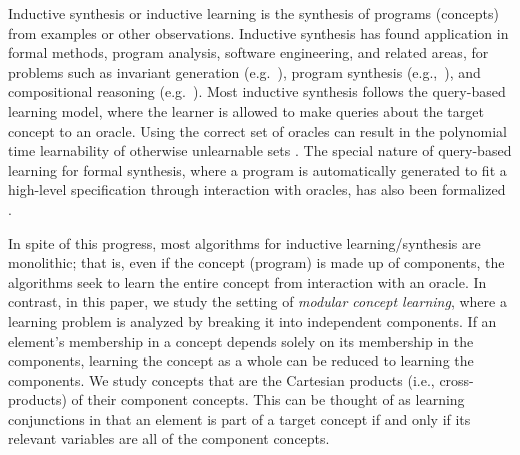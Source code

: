
Inductive synthesis or inductive learning 
is the synthesis of programs (concepts) from examples or other observations. 
Inductive synthesis has found application in formal methods, program analysis,
software engineering, and related areas, for problems such as 
invariant generation (e.g.~\cite{garg2014ice}),
program synthesis (e.g.,~\cite{solar2006combinatorial}),
and compositional reasoning (e.g.~\cite{cobleigh2003learning}).
Most inductive synthesis follows the query-based learning model, where the
learner is allowed to make queries about the target concept to an oracle. 
Using the correct set of oracles can result in the polynomial time learnability of otherwise unlearnable sets \cite{angluin1988queries}. 
The special nature of query-based learning for formal synthesis, where a program is automatically generated to fit a high-level specification through interaction with oracles,
has also been formalized \cite{jha2017theory}. 

In spite of this progress,
most algorithms for inductive learning/synthesis are monolithic; that is, even
if the concept (program) is made up of components, the algorithms seek to
learn the entire concept from interaction with an oracle.
In contrast, in this paper, we study the setting of {\em modular concept learning},
where a learning problem is analyzed by breaking it into independent components. 
If an element's membership in a concept depends solely on its membership in the components, learning the concept as a whole can be reduced to learning the components. 
We study concepts that are the Cartesian products (i.e., cross-products) of their component concepts.  
This can be thought of as learning conjunctions in that an element is part of a target concept if and only if its relevant variables are all of the component concepts. 

